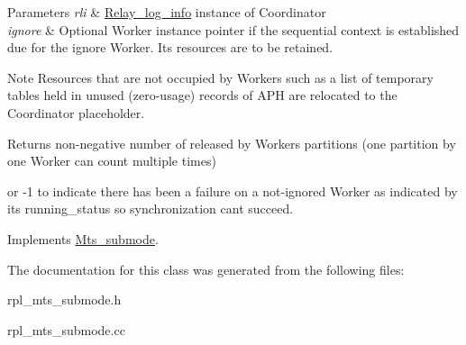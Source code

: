 \begin{DoxyParams}{Parameters}
{\em rli} & \mbox{\hyperlink{classRelay__log__info}{Relay\+\_\+log\+\_\+info}} instance of Coordinator \\
\hline
{\em ignore} & Optional Worker instance pointer if the sequential context is established due for the ignore Worker. Its resources are to be retained.\\
\hline
\end{DoxyParams}
\begin{DoxyNote}{Note}
Resources that are not occupied by Workers such as a list of temporary tables held in unused (zero-\/usage) records of A\+PH are relocated to the Coordinator placeholder.
\end{DoxyNote}
\begin{DoxyReturn}{Returns}
non-\/negative number of released by Workers partitions (one partition by one Worker can count multiple times)
\end{DoxyReturn}
or -\/1 to indicate there has been a failure on a not-\/ignored Worker as indicated by its running\+\_\+status so synchronization can\textquotesingle{}t succeed. 

Implements \mbox{\hyperlink{classMts__submode}{Mts\+\_\+submode}}.



The documentation for this class was generated from the following files\+:\begin{DoxyCompactItemize}
\item 
rpl\+\_\+mts\+\_\+submode.\+h\item 
rpl\+\_\+mts\+\_\+submode.\+cc\end{DoxyCompactItemize}
